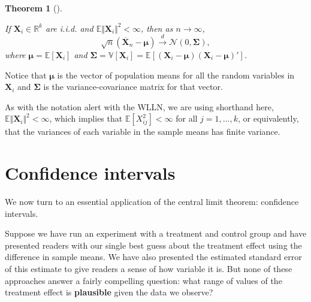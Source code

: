 \documentclass[
  letterpaper,
  DIV=11,
  numbers=noendperiod]{scrreprt}
\newcommand{\mb}{\symbf}
\newcommand{\E}{\mathbb{E}}
\newcommand{\V}{\mathbb{V}}
\newcommand{\N}{\mathcal{N}}
\newcommand{\X}{\mb{X}}
\newcommand{\indist}{\overset{d}{\to}}
\theoremstyle{plain}
\newtheorem{theorem}{Theorem}[chapter]
\theoremstyle{definition}
\theoremstyle{definition}
\theoremstyle{remark}
\begin{document}
\begin{theorem}[]\protect\hypertarget{thm-multivariate-clt}{}\label{thm-multivariate-clt}

If \(\mb{X}_i \in \mathbb{R}^k\) are i.i.d. and
\(\E\Vert \mb{X}_i \Vert^2 < \infty\), then as \(n \to \infty\), \[
\sqrt{n}\left( \overline{\mb{X}}_n - \mb{\mu}\right) \indist \N(0, \mb{\Sigma}),
\] where \(\mb{\mu} = \E[\mb{X}_i]\) and
\(\mb{\Sigma} = \V[\mb{X}_i] = \E\left[(\mb{X}_i-\mb{\mu})(\mb{X}_i - \mb{\mu})'\right]\).

\end{theorem}

Notice that \(\mb{\mu}\) is the vector of population means for all the
random variables in \(\X_i\) and \(\mb{\Sigma}\) is the
variance-covariance matrix for that vector.

\begin{tcolorbox}[enhanced jigsaw, opacityback=0, breakable, bottomtitle=1mm, opacitybacktitle=0.6, coltitle=black, leftrule=.75mm, toptitle=1mm, colback=white, titlerule=0mm, colframe=quarto-callout-note-color-frame, rightrule=.15mm, bottomrule=.15mm, toprule=.15mm, title=\textcolor{quarto-callout-note-color}{\faInfo}\hspace{0.5em}{Note}, left=2mm, arc=.35mm, colbacktitle=quarto-callout-note-color!10!white]

As with the notation alert with the WLLN, we are using shorthand here,
\(\E\Vert \mb{X}_i \Vert^2 < \infty\), which implies that
\(\E[X_{ij}^2] < \infty\) for all \(j = 1,\ldots, k\), or equivalently,
that the variances of each variable in the sample means has finite
variance.

\end{tcolorbox}

\hypertarget{confidence-intervals}{%
\section{Confidence intervals}\label{confidence-intervals}}

We now turn to an essential application of the central limit theorem:
confidence intervals.

Suppose we have run an experiment with a treatment and control group and
have presented readers with our single best guess about the treatment
effect using the difference in sample means. We have also presented the
estimated standard error of this estimate to give readers a sense of how
variable it is. But none of these approaches answer a fairly compelling
question: what range of values of the treatment effect is
\textbf{plausible} given the data we observe?
\end{document}
